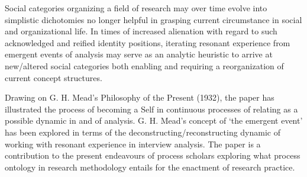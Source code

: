 Social categories organizing a field of research may over time evolve into simplistic dichotomies no longer helpful in grasping current circumstance in social and organizational life. In times of increased alienation with regard to such acknowledged and reified identity positions, iterating resonant experience from emergent events of analysis may serve as an analytic heuristic to arrive at new/altered social categories both enabling and requiring a reorganization of current concept structures. 

Drawing on G. H. Mead’s Philosophy of the Present (1932), the paper has illustrated the process of becoming a Self in continuous processes of relating as a possible dynamic in and of analysis. G. H. Mead’s concept of ‘the emergent event’ has been explored in terms of the deconstructing/reconstructing dynamic of working with resonant experience in interview analysis. The paper is a contribution to the present endeavours of process scholars exploring what process ontology in research methodology entails for the enactment of research practice.